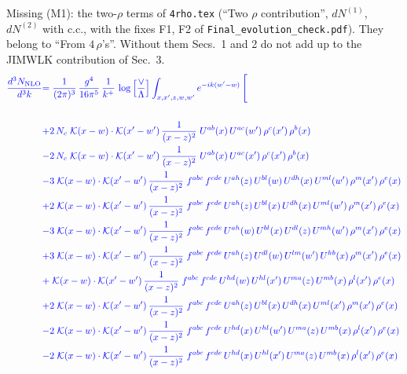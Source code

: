 \documentclass[9pt]{article}
\numberwithin{equation}{section}
\newcommand{\new}[1]{{\color{blue}#1}}
\begin{document}
\new{Missing (M1): the two-$\rho$ terms of \texttt{4rho.tex} (``Two $\rho$ contribution'', $dN^{(1)}$, $dN^{(2)}$ with c.c., with the fixes F1, F2 of \texttt{Final\_evolution\_check.pdf}). They belong to ``From $4\,\rho$'s''. Without them Secs.~1 and 2 do not add up to the JIMWLK contribution of Sec.~3.}
\begin{align}
{\color{blue}\frac{d^{3}N_{\mathrm{NLO}}}{d^{3}k}} & {\color{blue}= \frac{1}{(2\pi)^{3}}\,\frac{g^{4}}{16\pi^{5}}\,\frac{1}{k^{+}}\,\log\Big[\frac{\vee}{\Lambda}\Big]\int_{x,x',z,w,w'}e^{-ik(w'-w)}}\,{\color{blue}\Bigg[}\notag\\
\notag\\
&{\color{blue}+2\,N_c\;\mathcal{K}(x-w)\cdot\mathcal{K}(x'-w')\,\frac{1}{(x-z)^{2}}\;U^{ab}(x)\,U^{ac}(w')\,\rho^{c}(x')\,\rho^{b}(x)}\notag\\
&{\color{blue}-2\,N_c\;\mathcal{K}(x-w)\cdot\mathcal{K}(x'-w')\,\frac{1}{(x-z)^{2}}\;U^{ab}(x)\,U^{ac}(x')\,\rho^{c}(x')\,\rho^{b}(x)}\notag\\
&{\color{blue}-3\;\mathcal{K}(x-w)\cdot\mathcal{K}(x'-w')\,\frac{1}{(x-z)^{2}}\;f^{abc}\,f^{cde}\,U^{ah}(z)\,U^{bl}(w)\,U^{dh}(x)\,U^{ml}(w')\,\rho^{m}(x')\,\rho^{e}(x)}\notag\\
&{\color{blue}+2\;\mathcal{K}(x-w)\cdot\mathcal{K}(x'-w')\,\frac{1}{(x-z)^{2}}\;f^{abc}\,f^{cde}\,U^{ah}(z)\,U^{bl}(x)\,U^{dh}(x)\,U^{ml}(w')\,\rho^{m}(x')\,\rho^{e}(x)}\notag\\
&{\color{blue}-3\;\mathcal{K}(x-w)\cdot\mathcal{K}(x'-w')\,\frac{1}{(x-z)^{2}}\;f^{abc}\,f^{cde}\,U^{ah}(w)\,U^{bl}(x)\,U^{dl}(z)\,U^{mh}(w')\,\rho^{m}(x')\,\rho^{e}(x)}\notag\\
&{\color{blue}+3\;\mathcal{K}(x-w)\cdot\mathcal{K}(x'-w')\,\frac{1}{(x-z)^{2}}\;f^{abc}\,f^{cde}\,U^{ah}(z)\,U^{dl}(w)\,U^{lm}(w')\,U^{hb}(x)\,\rho^{m}(x')\,\rho^{e}(x)}\notag\\
&{\color{blue}+\;\mathcal{K}(x-w)\cdot\mathcal{K}(x'-w')\,\frac{1}{(x-z)^{2}}\;f^{abc}\,f^{cde}\,U^{hd}(w)\,U^{hl}(x')\,U^{ma}(z)\,U^{mb}(x)\,\rho^{l}(x')\,\rho^{e}(x)}\notag\\
&{\color{blue}+2\;\mathcal{K}(x-w)\cdot\mathcal{K}(x'-w')\,\frac{1}{(x-z)^{2}}\;f^{abc}\,f^{cde}\,U^{ah}(z)\,U^{bl}(x)\,U^{dh}(x)\,U^{ml}(x')\,\rho^{m}(x')\,\rho^{e}(x)}\notag\\
&{\color{blue}-2\;\mathcal{K}(x-w)\cdot\mathcal{K}(x'-w')\,\frac{1}{(x-z)^{2}}\;f^{abc}\,f^{cde}\,U^{hd}(x)\,U^{hl}(w')\,U^{ma}(z)\,U^{mb}(x)\,\rho^{l}(x')\,\rho^{e}(x)}\notag\\
&{\color{blue}-2\;\mathcal{K}(x-w)\cdot\mathcal{K}(x'-w')\,\frac{1}{(x-z)^{2}}\;f^{abc}\,f^{cde}\,U^{hd}(x)\,U^{hl}(x')\,U^{ma}(z)\,U^{mb}(x)\,\rho^{l}(x')\,\rho^{e}(x)}\notag\\

\end{align}
\end{document}
